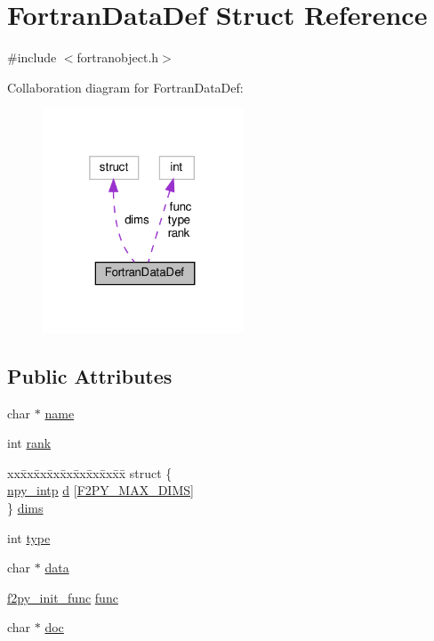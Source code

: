 \hypertarget{structFortranDataDef}{}\section{Fortran\+Data\+Def Struct Reference}
\label{structFortranDataDef}


{\ttfamily \#include $<$fortranobject.\+h$>$}



Collaboration diagram for Fortran\+Data\+Def\+:
\nopagebreak
\begin{figure}[H]
\begin{center}
\leavevmode
\includegraphics[width=169pt]{structFortranDataDef__coll__graph}
\end{center}
\end{figure}
\subsection*{Public Attributes}
\begin{DoxyCompactItemize}
\item 
char $\ast$ \hyperlink{structFortranDataDef_a92f20a73720f0cd46d9c062ecddb226c}{name}
\item 
int \hyperlink{structFortranDataDef_a5058ec159b7749be16aed072fd747512}{rank}
\item 
\begin{tabbing}
xx\=xx\=xx\=xx\=xx\=xx\=xx\=xx\=xx\=\kill
struct \{\\
\>\hyperlink{npy__common_8h_a2d6effc4d5ecb85675ebfcfaa102b483}{npy\_intp} \hyperlink{structFortranDataDef_a78bb950d1687bc17c7fdc40e91ec3da9}{d} \mbox{[}\hyperlink{fortranobject_8h_aaa88fe438f1789d7e965ab6ad0ad3a10}{F2PY\_MAX\_DIMS}\mbox{]}\\
\} \hyperlink{structFortranDataDef_a91fa385efbf67545a3b9c5bd945292ab}{dims}\\

\end{tabbing}\item 
int \hyperlink{structFortranDataDef_af8064eaf55b569cc849e1b77f1e34abd}{type}
\item 
char $\ast$ \hyperlink{structFortranDataDef_a69aea5e156b0997db5e751e2726369b6}{data}
\item 
\hyperlink{fortranobject_8h_a4203d7c36757a4bec0b9fd5503e6af56}{f2py\+\_\+init\+\_\+func} \hyperlink{structFortranDataDef_a660c9e10cf3051d67216f583c5978760}{func}
\item 
char $\ast$ \hyperlink{structFortranDataDef_a42e105111f776e93f511e629b165d270}{doc}
\end{DoxyCompactItemize}


